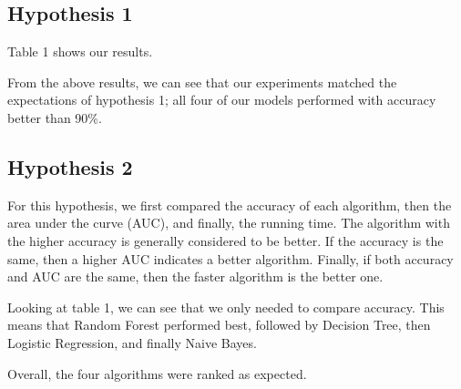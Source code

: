 \subsection{Hypothesis 1}

Table 1 shows our results.

\begin{table}[H]
\centering
{}
\caption{\label{demo-table}Results Of Our Experiments}
\end{table}
\raggedbottom

From the above results, we can see that our experiments matched the expectations of hypothesis 1; all four of our models performed with accuracy better than 90\%.

\subsection{Hypothesis 2}

For this hypothesis, we first compared the accuracy of each algorithm, then the area under the curve (AUC), and finally, the running time. The algorithm with the higher accuracy is generally considered to be better. If the accuracy is the same, then a higher AUC indicates a better algorithm. Finally, if both accuracy and AUC are the same, then the faster algorithm is the better one. 

Looking at table 1, we can see that we only needed to compare accuracy. This means that Random Forest performed best, followed by Decision Tree, then Logistic Regression, and finally Naive Bayes.

Overall, the four algorithms were ranked as expected.
